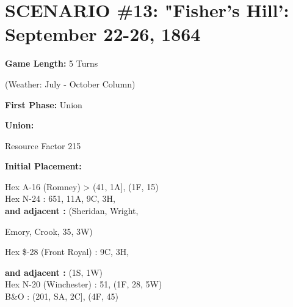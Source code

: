 \section{SCENARIO \#13: "Fisher's Hill': September 22-26, 1864
}


\begin{scenariodata}
\textbf{Game Length:} 5 Turns\\
\end{scenariodata}

\begin{scenariodata}
(Weather: July - October Column)\\
\end{scenariodata}

\begin{scenariodata}
\textbf{First Phase:} Union\\
\end{scenariodata}

\begin{scenariodata}
\textbf{Union:}\\
\end{scenariodata}

\begin{scenariodata}
Resource Factor 215\\
\end{scenariodata}

\begin{scenariodata}
\textbf{Initial Placement:}\\
\end{scenariodata}

\begin{scenariodata}
Hex A-16 (Romney) > (41, 1A], (1F, 15)\\
Hex N-24 : 651, 11A, 9C, 3H,\\
\textbf{and adjacent :} (Sheridan, Wright,\\
\end{scenariodata}

Emory, Crook, 35, 3W)

\begin{scenariodata}
Hex \$-28 (Front Royal) : 9C, 3H,\\
\end{scenariodata}

\begin{scenariodata}
\textbf{and adjacent :} (1S, 1W)\\
Hex N-20 (Winchester) : 51, (1F, 28, 5W)\\
B\&O : (201, SA, 2C], (4F, 45)\\
\end{scenariodata}

